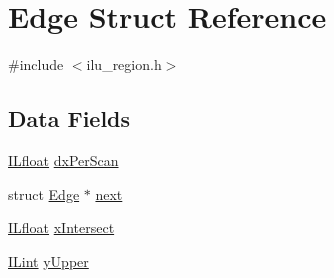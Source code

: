 \hypertarget{struct_edge}{\section{Edge Struct Reference}
\label{struct_edge}
}


{\ttfamily \#include $<$ilu\-\_\-region.\-h$>$}

\subsection*{Data Fields}
\begin{DoxyCompactItemize}
\item 
\hyperlink{il_8h_a0576415379485bafa4b5f61989797b5e}{I\-Lfloat} \hyperlink{struct_edge_ab19fdfb6f6fe1220d9d306a3235d323d}{dx\-Per\-Scan}
\item 
struct \hyperlink{struct_edge}{Edge} $\ast$ \hyperlink{struct_edge_a40a0c9e71e273ece78e764fe02d6e201}{next}
\item 
\hyperlink{il_8h_a0576415379485bafa4b5f61989797b5e}{I\-Lfloat} \hyperlink{struct_edge_adaae0c5a47d19f0451262eeefadec888}{x\-Intersect}
\item 
\hyperlink{il_8h_a288a97fb9e92e707a60b749d0039fafe}{I\-Lint} \hyperlink{struct_edge_abd58ae01ac30f5cb3e04b8b87767885e}{y\-Upper}
\end{DoxyCompactItemize}


